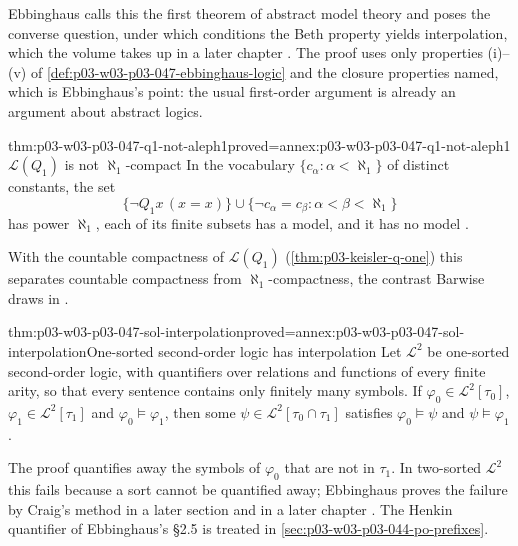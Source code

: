 Ebbinghaus calls this the first theorem of abstract model theory and poses
the converse question, under which conditions the Beth property yields
interpolation, which the volume takes up in a later chapter
\cite[Ch.~II, \S1.2, p.~32]{Ebbinghaus1985ExtendedLogics}.  The proof uses
only properties (i)--(v) of \cref{def:p03-w03-p03-047-ebbinghaus-logic} and
the closure properties named, which is Ebbinghaus's point: the usual
first-order argument is already an argument about abstract logics.

\begin{hbtheorem}{thm:p03-w03-p03-047-q1-not-aleph1}{proved=annex:p03-w03-p03-047-q1-not-aleph1}{\(\mathscr L(Q_1)\) is not \(\aleph_1\)-compact}
In the vocabulary \(\{c_\alpha:\alpha<\aleph_1\}\) of distinct constants,
the set
\[
 \{\neg Q_1x\,(x=x)\}\cup\{\neg c_\alpha=c_\beta:\alpha<\beta<\aleph_1\}
\]
has power \(\aleph_1\), each of its finite subsets has a model, and it has no
model \cite[Ch.~II, \S2.2, Example~1, p.~34]{Ebbinghaus1985ExtendedLogics}.
\end{hbtheorem}

With the countable compactness of \(\mathscr L(Q_1)\)
(\cref{thm:p03-keisler-q-one}) this separates countable compactness from
\(\aleph_1\)-compactness, the contrast Barwise draws in
\cite[Ch.~I, \S2.3, p.~16]{Barwise1985BackgroundAims}.

\begin{hbtheorem}{thm:p03-w03-p03-047-sol-interpolation}{proved=annex:p03-w03-p03-047-sol-interpolation}{One-sorted second-order logic has interpolation}
Let \(\mathscr L^2\) be one-sorted second-order logic, with quantifiers over
relations and functions of every finite arity, so that every sentence
contains only finitely many symbols.  If \(\varphi_0\in\mathscr L^2[\tau_0]\),
\(\varphi_1\in\mathscr L^2[\tau_1]\) and \(\varphi_0\models\varphi_1\), then
some \(\psi\in\mathscr L^2[\tau_0\cap\tau_1]\) satisfies
\(\varphi_0\models\psi\) and \(\psi\models\varphi_1\)
\cite[Ch.~II, \S2.1, Warning, p.~33]{Ebbinghaus1985ExtendedLogics}.
\end{hbtheorem}

The proof quantifies away the symbols of \(\varphi_0\) that are not in
\(\tau_1\).  In two-sorted \(\mathscr L^2\) this fails because a sort cannot
be quantified away; Ebbinghaus proves the failure by Craig's method in a
later section and in a later chapter
\cite[Ch.~II, \S2.1, Warning, p.~33]{Ebbinghaus1985ExtendedLogics}.  The
Henkin quantifier of Ebbinghaus's \S2.5 is treated in
\cref{sec:p03-w03-p03-044-po-prefixes}.

